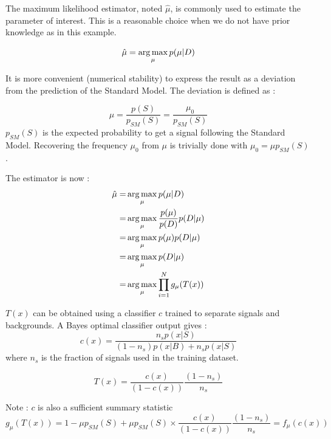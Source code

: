 The maximum likelihood estimator, noted $\hat \mu$, is commonly used to estimate the parameter of interest.
This is a reasonable choice when we do not have prior knowledge as in this example.

\begin{equation}
	\hat \mu = \operatorname*{arg\,max}_\mu p(\mu | D)
\end{equation}

It is more convenient (numerical stability) to express the result as a deviation from the prediction of the Standard Model.
The deviation is defined as :

\begin{equation}
	\mu = \frac{p(S)}{p_{SM}(S)} = \frac{\mu_0}{p_{SM}(S)}
\end{equation}
$p_{SM}(S)$ is the expected probability to get a signal following the Standard Model.
Recovering the frequency $\mu_0$ from $\mu$ is trivially done with $\mu_0 = \mu p_{SM}(S)$.

The estimator is now :
\begin{align}
	\hat\mu =& \operatorname*{arg\,max}_\mu p(\mu | D) \\
	     =& \operatorname*{arg\,max}_\mu \frac{p(\mu)}{p(D)} p(D | \mu) \\
	     =& \operatorname*{arg\,max}_\mu p(\mu) p(D | \mu) \\
	     =& \operatorname*{arg\,max}_\mu  p(D | \mu) \\
	     =& \operatorname*{arg\,max}_\mu  \prod_{i=1}^N g_\mu(T(x)) \\
\end{align}


$T(x)$ can be obtained using a classifier $c$ trained to separate signals and backgrounds.
A Bayes optimal classifier output gives :
\begin{equation}
	c(x) = \frac{n_s p(x|S)}{(1-n_s) p(x|B) + n_s p(x|S)}
\end{equation}
where $n_s$ is the fraction of signals used in the training dataset.

\begin{equation}
	T(x) = \frac{c(x)}{(1-c(x))} \frac{(1-n_s)}{n_s} 
\end{equation}


Note : $c$ is also a sufficient summary statistic
\begin{equation}
	g_\mu(T(x)) = 1 - \mu p_{SM}(S) + \mu p_{SM}(S) \times \frac{c(x)}{(1-c(x))} \frac{(1-n_s)}{n_s} = f_\mu(c(x))
\end{equation}








